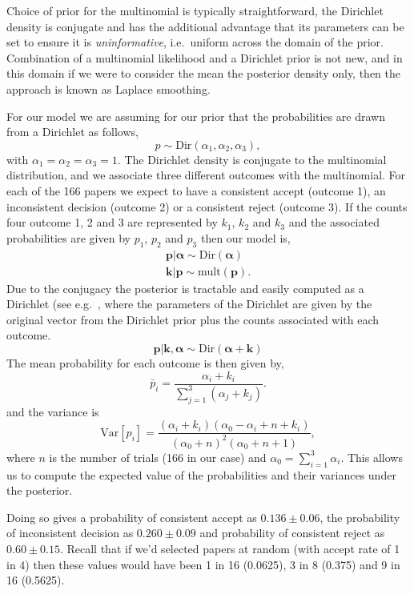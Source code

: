 Choice of prior for the multinomial is typically straightforward, the Dirichlet
density is
conjugate and has
the additional advantage that its parameters can be set to ensure it is
\emph{uninformative}, i.e.~uniform across the domain of the prior.
Combination of a multinomial likelihood and a Dirichlet prior is not
new, and in this domain if we were to consider the mean the posterior
density only, then the approach is known as
Laplace
smoothing.

For our model we are assuming for our prior that the probabilities are
drawn from a Dirichlet as follows, 
\[
p \sim \text{Dir}(\alpha_1, \alpha_2, \alpha_3),
\] 
with \(\alpha_1=\alpha_2=\alpha_3=1\). The Dirichlet density is
conjugate to the
multinomial
distribution, and we associate three different outcomes with the
multinomial. For each of the 166 papers we expect to have a consistent
accept (outcome 1), an inconsistent decision (outcome 2) or a consistent
reject (outcome 3). If the counts four outcome 1, 2 and 3 are
represented by \(k_1\), \(k_2\) and \(k_3\) and the associated
probabilities are given by \(p_1\), \(p_2\) and \(p_3\) then our model
is, \begin{align*}
\mathbf{p}|\boldsymbol{\alpha} \sim \text{Dir}(\boldsymbol{\alpha}) \\
\mathbf{k}|\mathbf{p} \sim \text{mult}(\mathbf{p}).
\end{align*} Due to the conjugacy the posterior is tractable and easily
computed as a Dirichlet (see
e.g.~\cite{Gelman-bayesian13},
where the parameters of the Dirichlet are given by the original vector
from the Dirichlet prior plus the counts associated with each outcome.
\[
\mathbf{p}|\mathbf{k}, \boldsymbol{\alpha} \sim \text{Dir}(\boldsymbol{\alpha} + \mathbf{k})
\] The mean probability for each outcome is then given by, \[
\bar{p}_i = \frac{\alpha_i+k_i}{\sum_{j=1}^3(\alpha_j + k_j)}.
\] and the variance is \[
\mathrm{Var}[p_i] = \frac{(\alpha_i+k_i) (\alpha_0-\alpha_i + n + k_i)}{(\alpha_0+n)^2 (\alpha_0+n+1)},
\] where \(n\) is the number of trials (166 in our case) and
\(\alpha_0 = \sum_{i=1}^3\alpha_i\). This allows us to compute the
expected value of the probabilities and their variances under the
posterior.

Doing so gives a probability of consistent accept as \(0.136 \pm 0.06\), the
probability of inconsistent decision as \(0.260 \pm 0.09\) and
probability of consistent reject as \(0.60 \pm 0.15\). Recall that if
we'd selected papers at random (with accept rate of 1 in 4) then these
values would have been 1 in 16 (0.0625), 3 in 8 (0.375) and 9 in 16
(0.5625).

